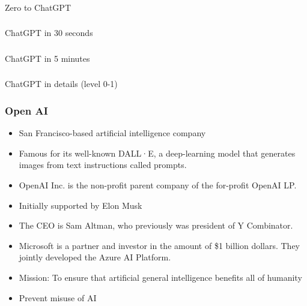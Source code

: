 \begin{frame}[fragile]\frametitle{}
\begin{center}
{\Large Zero to ChatGPT}
\end{center}
\end{frame}

\begin{frame}[fragile]\frametitle{}
\begin{center}
{\Large ChatGPT in 30 seconds}
\end{center}
\end{frame}

\begin{frame}[fragile]\frametitle{}
\begin{center}
{\Large ChatGPT in 5 minutes}
\end{center}
\end{frame}


\begin{frame}[fragile]\frametitle{}
\begin{center}
{\Large ChatGPT in details (level 0-1)}
\end{center}
\end{frame}

\begin{frame}[fragile]\frametitle{Open AI}


\begin{itemize}
\item San Francisco-based artificial intelligence company
\item Famous for its well-known DALL·E, a deep-learning model that generates images from text instructions called prompts.
\item OpenAI Inc. is the non-profit parent company of the for-profit OpenAI LP.
\item Initially supported by Elon Musk
\item The CEO is Sam Altman, who previously was president of Y Combinator.
\item Microsoft is a partner and investor in the amount of \$1 billion dollars. They jointly developed the Azure AI Platform.
\item Mission: To ensure that artificial general intelligence benefits all of humanity
\item Prevent misuse of AI
\end{itemize}	 

\end{frame}

